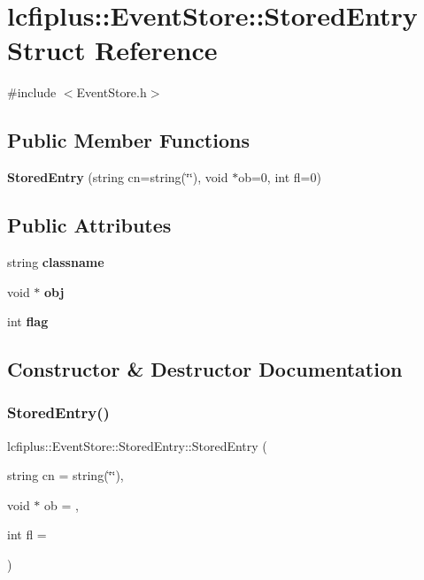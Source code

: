 \section{lcfiplus\+:\+:Event\+Store\+:\+:Stored\+Entry Struct Reference}
\label{structlcfiplus_1_1EventStore_1_1StoredEntry}


{\ttfamily \#include $<$Event\+Store.\+h$>$}

\subsection*{Public Member Functions}
\begin{DoxyCompactItemize}
\item 
\textbf{ Stored\+Entry} (string cn=string(\char`\"{}\char`\"{}), void $\ast$ob=0, int fl=0)
\end{DoxyCompactItemize}
\subsection*{Public Attributes}
\begin{DoxyCompactItemize}
\item 
string \textbf{ classname}
\item 
void $\ast$ \textbf{ obj}
\item 
int \textbf{ flag}
\end{DoxyCompactItemize}


\subsection{Constructor \& Destructor Documentation}
\mbox{\label{structlcfiplus_1_1EventStore_1_1StoredEntry_ad408046341a04e8b054c02dfb4dd9eeb}} 
\subsubsection{Stored\+Entry()}
{\footnotesize\ttfamily lcfiplus\+::\+Event\+Store\+::\+Stored\+Entry\+::\+Stored\+Entry (\begin{DoxyParamCaption}\item[{string}]{cn = {\ttfamily string(\char`\"{}\char`\"{})},  }\item[{void $\ast$}]{ob = {},  }\item[{int}]{fl = {} }\end{DoxyParamCaption})\hspace{0.3cm}{\ttfamily [inline]}}



